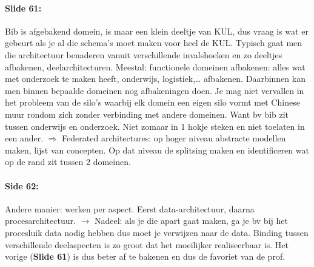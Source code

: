 \documentclass[10pt,a4paper]{report}
\begin{document}
\paragraph{Slide 61:}Bib is afgebakend domein, is maar een klein deeltje van KUL, dus vraag is wat er gebeurt als je al die schema's moet maken voor heel de KUL. Typisch gaat men die architectuur benaderen vanuit verschillende invalshoeken en zo deeltjes afbakenen, deelarchitecturen. Meestal: functionele domeinen afbakenen: alles wat met onderzoek te maken heeft, onderwijs, logistiek,… afbakenen. Daarbinnen kan men binnen bepaalde domeinen nog afbakeningen doen. Je mag niet vervallen in het probleem van de silo's waarbij elk domein een eigen silo vormt met Chinese muur rondom zich zonder verbinding met andere domeinen. Want bv bib zit tussen onderwijs en onderzoek. Niet zomaar in 1 hokje steken en niet toelaten in een ander. $\Rightarrow$ Federated architectures: op hoger niveau abstracte modellen maken, lijst van concepten. Op dat niveau de splitsing maken en identificeren wat op de rand zit tussen 2 domeinen.

\paragraph{Side 62:}Andere manier: werken per aspect. Eerst data-architectuur, daarna procesarchitectuur. $\rightarrow$ Nadeel: als je die apart gaat maken, ga je bv bij het procesluik data nodig hebben dus moet je verwijzen naar de data. Binding tussen verschillende deelaspecten is zo groot dat het moeilijker realiseerbaar is. Het vorige (\textbf{Slide 61}) is dus beter af te bakenen en dus de favoriet van de prof.
\end{document}
